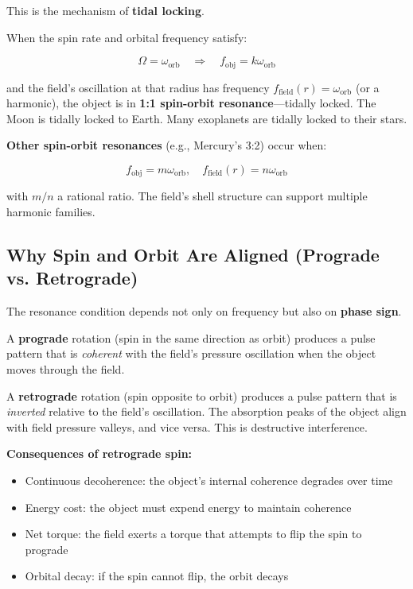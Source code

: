 \documentclass[12pt, a4paper]{article}
\begin{document}
This is the mechanism of \textbf{tidal locking}.

When the spin rate and orbital frequency satisfy:

\[
\Omega = \omega_{\text{orb}} \quad \Rightarrow \quad f_{\text{obj}} = k \omega_{\text{orb}}
\]

and the field's oscillation at that radius has frequency \( f_{\text{field}}(r) = \omega_{\text{orb}} \) (or a harmonic), the object is in \textbf{1:1 spin-orbit resonance}—tidally locked. The Moon is tidally locked to Earth. Many exoplanets are tidally locked to their stars.

\textbf{Other spin-orbit resonances} (e.g., Mercury's 3:2) occur when:

\[
f_{\text{obj}} = m \omega_{\text{orb}}, \quad f_{\text{field}}(r) = n \omega_{\text{orb}}
\]

with \( m/n \) a rational ratio. The field's shell structure can support multiple harmonic families.

\subsection{Why Spin and Orbit Are Aligned (Prograde vs. Retrograde)}
\label{subsec:prograde_retrograde}

The resonance condition depends not only on frequency but also on \textbf{phase sign}.

A \textbf{prograde} rotation (spin in the same direction as orbit) produces a pulse pattern that is \textit{coherent} with the field's pressure oscillation when the object moves through the field.

A \textbf{retrograde} rotation (spin opposite to orbit) produces a pulse pattern that is \textit{inverted} relative to the field's oscillation. The absorption peaks of the object align with field pressure valleys, and vice versa. This is destructive interference.

\textbf{Consequences of retrograde spin:}
\begin{itemize}
    \item Continuous decoherence: the object's internal coherence degrades over time
    \item Energy cost: the object must expend energy to maintain coherence
    \item Net torque: the field exerts a torque that attempts to flip the spin to prograde
    \item Orbital decay: if the spin cannot flip, the orbit decays
\end{itemize}
\end{document}
